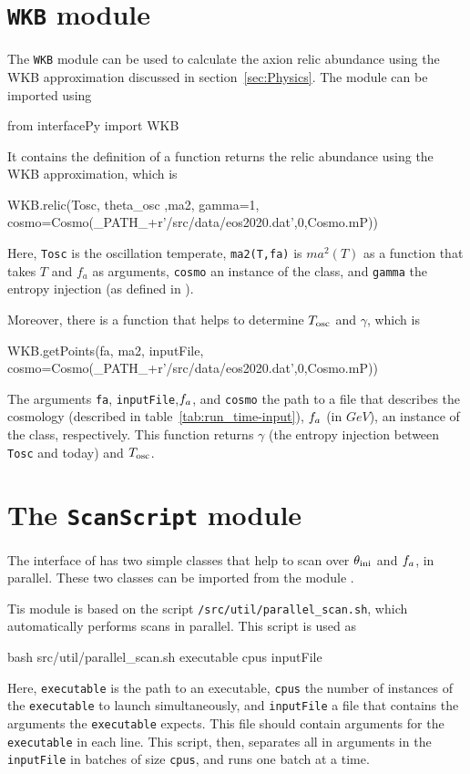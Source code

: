 \documentclass[11pt,a4paper]{article}
\begin{document}
\section{{\tt WKB} module}\label{app:ScanScript}
%
The {\tt WKB} module can be used to calculate the axion relic abundance using the WKB approximation discussed in section~\ref{sec:Physics}. The module can be imported using 
%
\begin{py}
	from interfacePy import WKB
\end{py}
%
It contains the definition of a function returns the relic abundance using the WKB approximation, which is 
%
\begin{py}
	WKB.relic(Tosc, theta_osc ,ma2, gamma=1, 
	          cosmo=Cosmo(_PATH_+r'/src/data/eos2020.dat',0,Cosmo.mP))
\end{py}
%
Here, {\tt Tosc} is the oscillation temperate, {\tt ma2(T,fa)} is $ma^2(T)$ as a function that takes $T$ and $f_a$ as arguments, {\tt cosmo} an instance of the  class, and {\tt gamma} the entropy injection (as defined in ). 

Moreover, there is a function that helps to determine $T_{\rm osc}{}$ and $\gamma$, which is
%
\begin{py}
	WKB.getPoints(fa, ma2, inputFile, cosmo=Cosmo(_PATH_+r'/src/data/eos2020.dat',0,Cosmo.mP))
\end{py}
%
The arguments {\tt fa}, {\tt inputFile},$f_{a}{}$, and {\tt cosmo} the path to a file that describes the cosmology (described in table~\ref{tab:run_time-input}), $f_{a}{}$ (in $GeV$), an instance of the  class, respectively.  
%
This function returns $\gamma$ (the entropy injection between {\tt Tosc} and today) and $T_{\rm osc}{}$.
 

\section{The {\tt ScanScript} module}\label{app:ScanScript}
%
The \PY interface of \mimes has two simple classes that help to scan over $\theta_{\rm ini}{}$ and $f_{a}{}$, in parallel. These two classes can be imported from the module .  

Tis module is based on the  script {\tt \mimes/src/util/parallel\_scan.sh}, which automatically performs scans in parallel. This script is used as
%
\begin{py}
	bash src/util/parallel_scan.sh executable cpus inputFile
\end{py}  
%
Here, {\tt executable} is the path to an executable, {\tt cpus} the number of instances of the {\tt executable} to launch simultaneously, and {\tt inputFile} a file that contains the arguments the {\tt executable} expects. This file should contain arguments for the {\tt executable} in each line. This script, then, separates all in arguments in the {\tt inputFile} in batches of size {\tt cpus}, and runs one batch at a time.  
\end{document}
